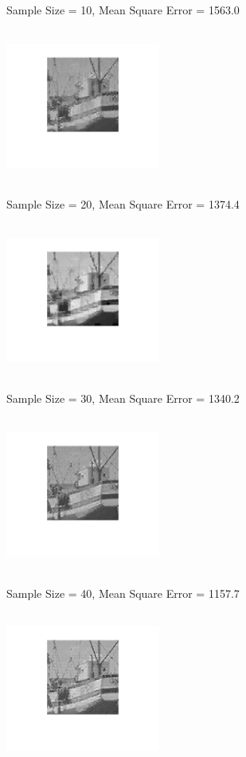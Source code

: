 \documentclass{article}
\begin{document}
Sample Size = 10, Mean Square Error = 1563.0

\includegraphics[width=2in,height=2in]{1-20.png}
\vspace{-0.5in}

Sample Size = 20, Mean Square Error = 1374.4

\includegraphics[width=2in,height=2in]{1-30.png}
\vspace{-0.5in}

Sample Size = 30, Mean Square Error = 1340.2

\includegraphics[width=2in,height=2in]{1-40.png}
\vspace{-0.5in}

Sample Size = 40, Mean Square Error = 1157.7

\includegraphics[width=2in,height=2in]{1-50.png}
\vspace{-0.5in}
\end{document}
